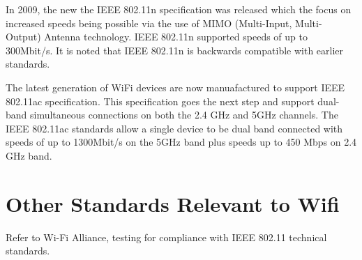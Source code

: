 In 2009, the new the IEEE 802.11n specification was released which the focus on increased speeds being possible via the use of MIMO (Multi-Input, Multi-Output) Antenna technology. IEEE 802.11n supported speeds of up to 300Mbit/s. It is noted that IEEE 802.11n is backwards compatible with earlier standards.

The latest generation of WiFi devices are now manuafactured to support IEEE 802.11ac specification.  This specification goes the next step and support dual-band simultaneous connections on both the 2.4 GHz and 5GHz channels. The IEEE 802.11ac standards allow a single device to be dual band connected with speeds of up to 1300Mbit/s on the 5GHz band plus speeds up to 450 Mbps on 2.4 GHz band.



\section{Other Standards Relevant to Wifi}

Refer to Wi-Fi Alliance, testing for compliance with IEEE 802.11 technical standards.